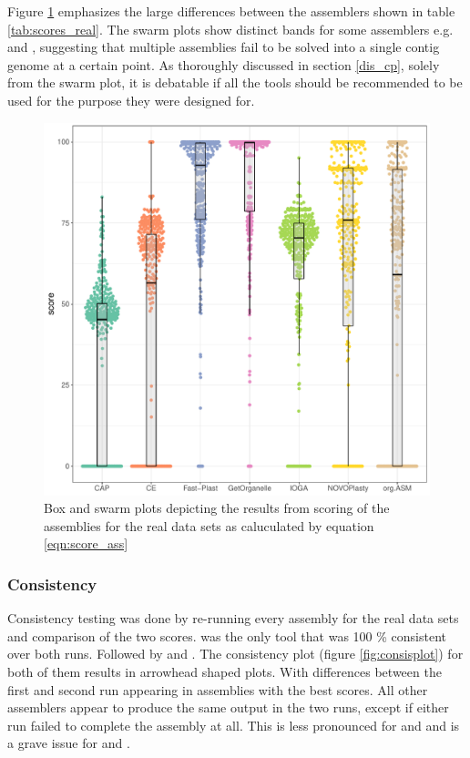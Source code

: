Figure \ref{fig:swarm} emphasizes the large differences between the assemblers shown in
table \ref{tab:scores_real}. The swarm plots show distinct bands for some assemblers
e.g. \np \hspace{0.25ex} and \oa, suggesting that multiple assemblies fail to be solved
into a single contig genome at a certain point. As thoroughly discussed in section
\ref{dis_cp}, solely from the swarm plot, it is debatable if all the tools should be
recommended to be used for the purpose they were designed for.

\begin{figure}[H]
\centering
\includegraphics[height=.5\textheight, width=1\textwidth]{Figures/swarm}
\decoRule
\caption[Scores of assemblies from real data sets]{Box and swarm plots depicting the
  results from scoring of the assemblies for the real data sets as caluculated by equation
  \ref{eqn:score_ass}}
\label{fig:swarm}
\end{figure}

\subsubsection{Consistency}

Consistency testing was done by re-running every assembly for the real data sets and
comparison of the two scores. \ce \hspace{0.25ex} was the only tool that was 100 \%
consistent over both runs. Followed by \fp \hspace{0.25ex} and \np. The consistency plot (figure
\ref{fig:consisplot}) for both of them results in arrowhead shaped plots. With differences
between the first and second run appearing in assemblies with the best scores. All other
assemblers appear to produce the same output in the two runs, except if either run failed
to complete the assembly at all. This is less pronounced for \cassp \hspace{0.25ex} and
\go\hspace{0.25ex} and is a grave issue for \oa \hspace{0.25ex} and \ioga.

